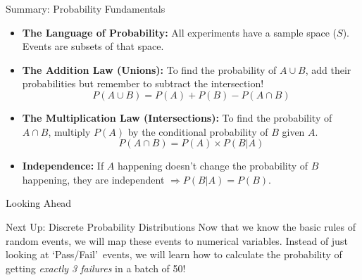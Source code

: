 \begin{frame}{Summary: Probability Fundamentals}
    \begin{itemize}
        \item \textbf{The Language of Probability:} All experiments have a sample space ($S$). Events are subsets of that space.
        \vspace{0.2cm}
        \item \textbf{The Addition Law (Unions):} To find the probability of $A \cup B$, add their probabilities but remember to subtract the intersection!
        \[ P(A \cup B) = P(A) + P(B) - P(A \cap B) \]
        \vspace{0.1cm}
        \item \textbf{The Multiplication Law (Intersections):} To find the probability of $A \cap B$, multiply $P(A)$ by the conditional probability of $B$ given $A$.
        \[ P(A \cap B) = P(A) \times P(B|A) \]
        \vspace{0.1cm}
        \item \textbf{Independence:} If $A$ happening doesn't change the probability of $B$ happening, they are independent $\Rightarrow P(B|A) = P(B)$.
    \end{itemize}
\end{frame}

\begin{frame}{Looking Ahead}
    \begin{block}{Next Up: Discrete Probability Distributions}
        Now that we know the basic rules of random events, we will map these events to numerical variables. Instead of just looking at \lq Pass/Fail\rq\ events, we will learn how to calculate the probability of getting \textit{exactly 3 failures} in a batch of 50!
    \end{block}
\end{frame}


